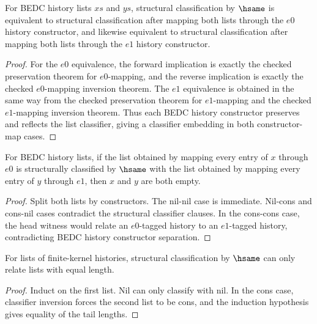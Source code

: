 \begin{theorem}
\label{thm:list-classifier-constructor-map-embeddings}
For BEDC history lists $xs$ and $ys$, structural classification by $\hsame$ is
equivalent to structural classification after mapping both lists through the
$e0$ history constructor, and likewise equivalent to structural classification
after mapping both lists through the $e1$ history constructor.
\end{theorem}
\begin{proof}
For the $e0$ equivalence, the forward implication is exactly the checked
preservation theorem for $e0$-mapping, and the reverse implication is exactly
the checked $e0$-mapping inversion theorem. The $e1$ equivalence is obtained in
the same way from the checked preservation theorem for $e1$-mapping and the
checked $e1$-mapping inversion theorem. Thus each BEDC history constructor
preserves and reflects the list classifier, giving a classifier embedding in
both constructor-map cases.
\end{proof}

\begin{theorem}
\label{thm:list-classifier-mixed-tag-empty}
For BEDC history lists, if the list obtained by mapping every entry of \(x\)
through \(e0\) is structurally classified by \(\hsame\) with the list obtained
by mapping every entry of \(y\) through \(e1\), then \(x\) and \(y\) are both
empty.
\end{theorem}
\begin{proof}
Split both lists by constructors. The nil-nil case is immediate. Nil-cons and
cons-nil cases contradict the structural classifier clauses. In the cons-cons
case, the head witness would relate an \(e0\)-tagged history to an \(e1\)-tagged
history, contradicting BEDC history constructor separation.
\end{proof}

\begin{theorem}
\label{thm:list-classifier-hsame-length-eq}
For lists of finite-kernel histories, structural classification by \(\hsame\) can only relate lists with equal length.
\end{theorem}
\begin{proof}
Induct on the first list. Nil can only classify with nil. In the cons case, classifier inversion forces the second list to be cons, and the induction hypothesis gives equality of the tail lengths.
\end{proof}

